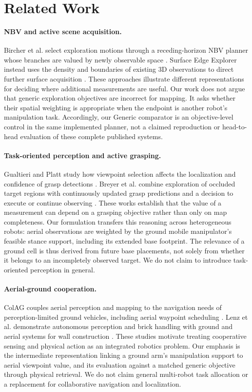 \section{Related Work}
\label{sec:related}
\paragraph{NBV and active scene acquisition.}
Bircher et al. select exploration motions through a receding-horizon NBV planner
whose branches are valued by newly observable space \cite{bircher2016nbv}.
Surface Edge Explorer instead uses the density and boundaries of existing 3D
observations to direct further surface acquisition \cite{border2018see}.
These approaches illustrate different representations for deciding where
additional measurements are useful. Our work does not argue that generic
exploration objectives are incorrect for mapping. It asks whether their
spatial weighting is appropriate when the endpoint is another robot's
manipulation task. Accordingly, our Generic comparator is an objective-level
control in the same implemented planner, not a claimed reproduction or
head-to-head evaluation of these complete published systems.

\paragraph{Task-oriented perception and active grasping.}
Gualtieri and Platt study how viewpoint selection affects the localization and
confidence of grasp detections \cite{gualtieri2017viewpoint}. Breyer et al.
combine exploration of occluded target regions with continuously updated grasp
predictions and a decision to execute or continue observing
\cite{breyer2022target}. These works establish that the value of a measurement
can depend on a grasping objective rather than only on map completeness.
Our formulation transfers this reasoning across heterogeneous robots: aerial
observations are weighted by the ground mobile manipulator's feasible stance
support, including its extended base footprint. The relevance of a ground cell
is thus derived from future base placements, not solely from whether it belongs
to an incompletely observed target. We do not claim to introduce task-oriented
perception in general.

\paragraph{Aerial-ground cooperation.}
ColAG couples aerial perception and mapping to the navigation needs of
perception-limited ground vehicles, including aerial waypoint scheduling
\cite{li2023colag}. Lenz et al. demonstrate autonomous perception and brick
handling with ground and aerial systems for wall construction
\cite{lenz2020wall}. These studies motivate treating cooperative sensing and
physical action as an integrated robotics problem. Our emphasis is the
intermediate representation linking a ground arm's manipulation support to
aerial viewpoint value, and its evaluation against a matched generic objective
through physical retrieval. We do not claim general multi-robot task allocation
or a replacement for collaborative navigation and localization.

